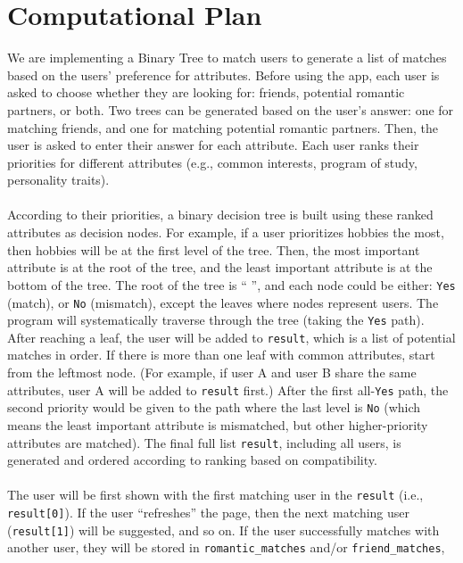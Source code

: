 \documentclass[fontsize=11pt]{article}
\begin{document}
\section*{Computational Plan}

We are implementing a Binary Tree to match users to generate a list of matches based on the users’ preference for attributes.
Before using the app, each user is asked to choose whether they are looking for: friends, potential romantic partners, or both.
Two trees can be generated based on the user’s answer: one for matching friends, and one for matching potential romantic partners.
Then, the user is asked to enter their answer for each attribute.
Each user ranks their priorities for different attributes (e.g., common interests, program of study, personality traits).
\\
\\
According to their priorities, a binary decision tree is built using these ranked attributes as decision nodes.
For example, if a user prioritizes hobbies the most, then hobbies will be at the first level of the tree.
Then, the most important attribute is at the root of the tree, and the least important attribute is at the bottom of the tree.
The root of the tree is “ ”, and each node could be either: \texttt{Yes} (match), or \texttt{No} (mismatch), except the leaves where nodes represent users.
The program will systematically traverse through the tree (taking the \texttt{Yes} path).
After reaching a leaf, the user will be added to \texttt{result}, which is a list of potential matches in order.
If there is more than one leaf with common attributes, start from the leftmost node.
(For example, if user A and user B share the same attributes, user A will be added to \texttt{result} first.)
After the first all-\texttt{Yes} path, the second priority would be given to the path where the last level is \texttt{No}
(which means the least important attribute is mismatched, but other higher-priority attributes are matched).
The final full list \texttt{result}, including all users, is generated and ordered according to ranking based on compatibility.
\\
\\
The user will be first shown with the first matching user in the \texttt{result}  (i.e., \texttt{result[0]}).
If the user “refreshes” the page, then the next matching user (\texttt{result[1]}) will be suggested, and so on.
If the user successfully matches with another user, they will be stored in \texttt{romantic\_matches} and/or \texttt{friend\_matches},
\end{document}
